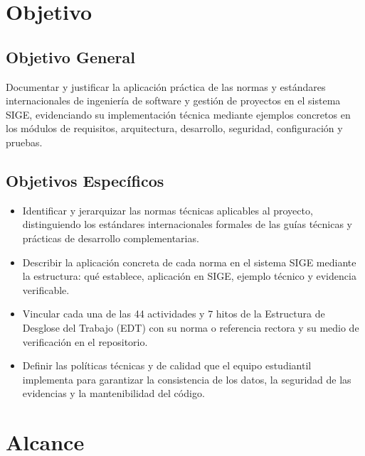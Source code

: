 \documentclass[12pt,a4paper]{article}
\begin{document}
\section{Objetivo}

\subsection{Objetivo General}
Documentar y justificar la aplicación práctica de las normas y estándares internacionales de ingeniería de software y gestión de proyectos en el sistema SIGE, evidenciando su implementación técnica mediante ejemplos concretos en los módulos de requisitos, arquitectura, desarrollo, seguridad, configuración y pruebas.

\subsection{Objetivos Específicos}
\begin{itemize}[leftmargin=1.5em, itemsep=2pt]
    \item Identificar y jerarquizar las normas técnicas aplicables al proyecto, distinguiendo los estándares internacionales formales de las guías técnicas y prácticas de desarrollo complementarias.
    \item Describir la aplicación concreta de cada norma en el sistema SIGE mediante la estructura: qué establece, aplicación en SIGE, ejemplo técnico y evidencia verificable.
    \item Vincular cada una de las 44 actividades y 7 hitos de la Estructura de Desglose del Trabajo (EDT) con su norma o referencia rectora y su medio de verificación en el repositorio.
    \item Definir las políticas técnicas y de calidad que el equipo estudiantil implementa para garantizar la consistencia de los datos, la seguridad de las evidencias y la mantenibilidad del código.
\end{itemize}

\section{Alcance}
\end{document}
